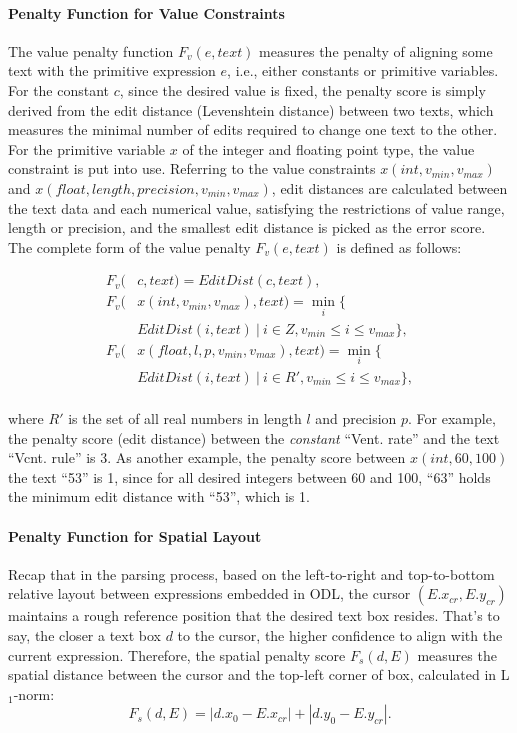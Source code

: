 \paragraph{Penalty Function for Value Constraints}
The value penalty function $F_v(e, text)$ measures the penalty of
aligning some text with the primitive expression $e$,
i.e., either constants or primitive variables.
For the constant $c$, since the desired value is fixed, the penalty score
is simply derived from the edit distance (Levenshtein distance)
between two texts,
which measures the minimal number of edits required to change one text to
the other.
For the primitive variable $x$ of the integer and floating point type,
the value constraint is put into use.
Referring to the value constraints $x(int, v_{min}, v_{max})$ and
$x(float, length, precision, v_{min}, v_{max})$,
edit distances are calculated between the text data and each numerical value,
satisfying the restrictions of value range, length or precision,
and the smallest edit distance is picked as the error score.
The complete form of the value penalty $F_v(e, text)$ is defined as follows:

\begin{equation}
  \begin{aligned}
    F_v(& c,text) = EditDist(c, text), \\
    F_v(& x(int,v_{min},v_{max}),text)= \min_i\{ \\
        & EditDist(i,text)\ |\ i \in Z, v_{min} \leq i \leq v_{max}\}, \\
    F_v(& x(float,l,p,v_{min},v_{max}),text)= \min_i\{ \\
        & EditDist(i,text)\ |\ i \in R', v_{min} \leq i \leq v_{max}\}, \\
  \end{aligned}
\end{equation}

\noindent
where $R'$ is the set of all real numbers in length $l$ and precision $p$.
For example, the penalty score (edit distance)
between the \textit{constant} ``Vent. rate'' and the text ``Vcnt. rule'' is 3.
As another example, the penalty score between $x(int, 60, 100)$ the text ``53''
is 1, since for all desired integers between 60 and 100,
``63'' holds the minimum edit distance with ``53'', which is 1.

\paragraph{Penalty Function for Spatial Layout}
Recap that in the parsing process, based on the left-to-right and top-to-bottom
relative layout between expressions embedded in ODL,
the cursor $(E.x_{cr}, E.y_{cr})$ maintains a rough reference position
that the desired text box resides.
That's to say, the closer a text box $d$ to the cursor,
the higher confidence to align with the current expression.
Therefore, the spatial penalty score $F_s(d, E)$ measures the spatial distance
between the cursor and the top-left corner of box, calculated in L$_1$-norm:
\begin{equation}
	F_s(d, E) = |d.x_0 - E.x_{cr}| + |d.y_0 - E.y_{cr}|.
\end{equation}

